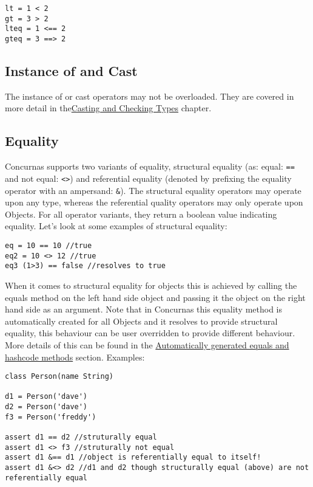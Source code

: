 \documentclass[conc-doc]{subfiles}
\begin{document}
\begin{lstlisting}
lt = 1 < 2
gt = 3 > 2
lteq = 1 <== 2
gteq = 3 ==> 2
\end{lstlisting}

\subsection{Instance of and Cast}
The instance of or cast operators may not be overloaded. They are covered in more detail in the\hyperref[ch:castAndcheck]{Casting and Checking Types} chapter.

\subsection{Equality}
Concurnas supports two variants of equality, structural equality (as: equal: \lstinline{==} and not equal: \lstinline{<>}) and referential equality (denoted by prefixing the equality operator with an ampersand: \lstinline{&}). The structural equality operators may operate upon any type, whereas the referential quality operators may only operate upon Objects. For all operator variants, they return a boolean value indicating equality. Let's look at some examples of structural equality:

\begin{lstlisting}
eq = 10 == 10 //true
eq2 = 10 <> 12 //true
eq3 (1>3) == false //resolves to true
\end{lstlisting}

When it comes to structural equality for objects this is achieved by calling the equals method on the left hand side object and passing it the object on the right hand side as an argument. Note that in Concurnas this equality method is automatically created for all Objects and it resolves to provide structural equality, this behaviour can be user overridden to provide different behaviour. More details of this can be found in the \hyperref[autoGeneqAndHash]{Automatically generated equals and hashcode methods} section. Examples:


\begin{lstlisting}
class Person(name String)

d1 = Person('dave')
d2 = Person('dave')
f3 = Person('freddy')

assert d1 == d2 //struturally equal
assert d1 <> f3 //struturally not equal
assert d1 &== d1 //object is referentially equal to itself!
assert d1 &<> d2 //d1 and d2 though structurally equal (above) are not referentially equal
\end{lstlisting}
\end{document}

